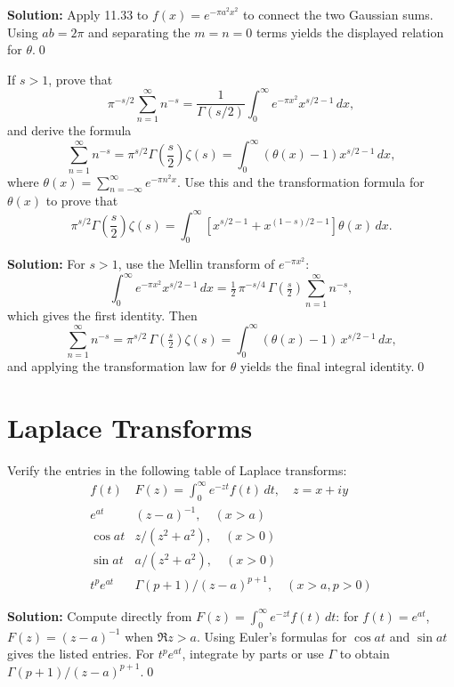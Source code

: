 \noindent\textbf{Solution:}
Apply 11.33 to $f(x)=e^{-\pi a^2 x^2}$ to connect the two Gaussian sums. Using $ab=2\pi$ and separating the $m=n=0$ terms yields the displayed relation for $\theta$.\qed


\begin{problembox}
If $s > 1$, prove that
\[
\pi^{-s/2} \sum_{n=1}^\infty n^{-s} = \frac{1}{\Gamma(s/2)} \int_0^\infty e^{-\pi x^2} x^{s/2-1} \, dx,
\]
and derive the formula
\[
\sum_{n=1}^\infty n^{-s} = \pi^{s/2} \Gamma\left(\frac{s}{2}\right) \zeta(s) = \int_0^\infty \left( \theta(x) - 1 \right) x^{s/2-1} \, dx,
\]
where $\theta(x) = \sum_{n=-\infty}^\infty e^{-\pi n^2 x}$. Use this and the transformation formula for $\theta(x)$ to prove that
\[
\pi^{s/2} \Gamma\left(\frac{s}{2}\right) \zeta(s) = \int_0^\infty \left[ x^{s/2-1} + x^{(1-s)/2-1} \right] \theta(x) \, dx.
\]
\end{problembox}

\noindent\textbf{Solution:}
For $s>1$, use the Mellin transform of $e^{-\pi x^2}$:
\[\int_0^{\infty} e^{-\pi x^2} x^{s/2-1}\,dx = \tfrac{1}{2}\,\pi^{-s/4}\,\Gamma\!\left(\tfrac{s}{2}\right)\sum_{n=1}^{\infty} n^{-s},\]
which gives the first identity. Then
\[\sum_{n=1}^{\infty} n^{-s}=\pi^{s/2}\,\Gamma\!\left(\tfrac{s}{2}\right)\zeta(s)=\int_0^{\infty} (\theta(x)-1)\,x^{s/2-1}\,dx,\]
and applying the transformation law for $\theta$ yields the final integral identity.\qed
\section{Laplace Transforms}



\begin{problembox}
Verify the entries in the following table of Laplace transforms:
\[
\begin{array}{ll}
f(t) & F(z) = \int_0^\infty e^{-zt} f(t) \, dt, \quad z = x + iy \\
e^{at} & (z - a)^{-1}, \quad (x > a) \\
\cos at & z/(z^2 + a^2), \quad (x > 0) \\
\sin at & a/(z^2 + a^2), \quad (x > 0) \\
t^p e^{at} & \Gamma(p + 1)/(z - a)^{p+1}, \quad (x > a, p > 0)
\end{array}
\]
\end{problembox}

\noindent\textbf{Solution:}
Compute directly from $F(z)=\int_0^{\infty} e^{-zt} f(t)\,dt$: for $f(t)=e^{at}$, $F(z)=(z-a)^{-1}$ when $\Re z>a$. Using Euler's formulas for $\cos at$ and $\sin at$ gives the listed entries. For $t^p e^{at}$, integrate by parts or use $\Gamma$ to obtain $\Gamma(p+1)/(z-a)^{p+1}$.\qed


